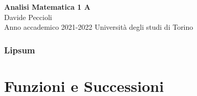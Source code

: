 \documentclass[11pt, titlepage]{article}
\begin{document}
\begin{titlepage}
\null
\vfill
\begin{center}
{\Huge \textbf{Analisi Matematica 1 A}}\\
\vspace{1em}
{\large Davide Peccioli}\\
\vspace{0.6em}
{\large Anno accademico 2021-2022}
\vfill
Università degli studi di Torino
\end{center}
\end{titlepage}
{\pagestyle{empty}
\null\newpage}

\tableofcontents\cleardoublepage









\section{Lipsum}
\lipsum

\part{Funzioni e Successioni}












\end{document}
